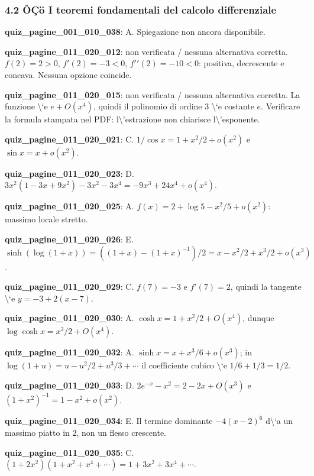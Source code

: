 \documentclass[11pt,a4paper]{article}
\newcounter{quiz}
\begin{document}
\subsubsection*{4.2 ÔÇö I teoremi fondamentali del calcolo differenziale}
\noindent\textbf{quiz\_pagine\_001\_010\_038}: A. Spiegazione non ancora disponibile.\par\medskip
\noindent\textbf{quiz\_pagine\_011\_020\_012}: non verificata / nessuna alternativa corretta. $f(2)=2>0$, $f\prime(2)=-3<0$, $f\prime\prime(2)=-10<0$: positiva, decrescente e concava. Nessuna opzione coincide.\par\medskip
\noindent\textbf{quiz\_pagine\_011\_020\_015}: non verificata / nessuna alternativa corretta. La funzione \textbackslash{}`e $e+O(x^4)$, quindi il polinomio di ordine 3 \textbackslash{}`e costante $e$. Verificare la formula stampata nel PDF: l\textbackslash{}'estrazione non chiarisce l\textbackslash{}'esponente.\par\medskip
\noindent\textbf{quiz\_pagine\_011\_020\_021}: C. $1/\cos x=1+x^2/2+o(x^2)$ e $\sin x=x+o(x^2)$.\par\medskip
\noindent\textbf{quiz\_pagine\_011\_020\_023}: D. $3x^2(1-3x+9x^2)-3x^2-3x^4=-9x^3+24x^4+o(x^4)$.\par\medskip
\noindent\textbf{quiz\_pagine\_011\_020\_025}: A. $f(x)=2+\log5-x^2/5+o(x^2)$: massimo locale stretto.\par\medskip
\noindent\textbf{quiz\_pagine\_011\_020\_026}: E. $\sinh(\log(1+x))=((1+x)-(1+x)^{-1})/2=x-x^2/2+x^3/2+o(x^3)$.\par\medskip
\noindent\textbf{quiz\_pagine\_011\_020\_029}: C. $f(7)=-3$ e $f\prime(7)=2$, quindi la tangente \textbackslash{}`e $y=-3+2(x-7)$.\par\medskip
\noindent\textbf{quiz\_pagine\_011\_020\_030}: A. $\cosh x=1+x^2/2+O(x^4)$, dunque $\log\cosh x=x^2/2+O(x^4)$.\par\medskip
\noindent\textbf{quiz\_pagine\_011\_020\_032}: A. $\sinh x=x+x^3/6+o(x^3)$; in $\log(1+u)=u-u^2/2+u^3/3+\cdots$ il coefficiente cubico \textbackslash{}`e $1/6+1/3=1/2$.\par\medskip
\noindent\textbf{quiz\_pagine\_011\_020\_033}: D. $2e^{-x}-x^2=2-2x+O(x^3)$ e $(1+x^2)^{-1}=1-x^2+o(x^2)$.\par\medskip
\noindent\textbf{quiz\_pagine\_011\_020\_034}: E. Il termine dominante $-4(x-2)^6$ d\textbackslash{}`a un massimo piatto in $2$, non un flesso crescente.\par\medskip
\noindent\textbf{quiz\_pagine\_011\_020\_035}: C. $(1+2x^2)(1+x^2+x^4+\cdots)=1+3x^2+3x^4+\cdots$.\par\medskip
\end{document}
